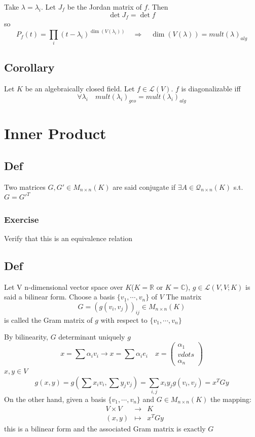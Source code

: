 \documentclass{book}
\begin{document}
Take $\lambda=\lambda_i$. Let $J_f$ be the Jordan matrix of $f$. Then $$\det J_f=\det f$$
so 
$$P_f(t)=\prod\limits_i(t-\lambda_i)^{\dim (V(\lambda_i))}\quad\Rightarrow\quad \dim(V(\lambda))=mult(\lambda)_{alg}$$
\section{Corollary}
Let $K$ be an algebraically closed field. Let $f\in \mathscr{L}(V)$. $f$ is diagonalizable iff $$\forall\lambda_i\quad mult(\lambda_i)_{geo}=mult(\lambda_i)_{alg}$$
\chapter{Inner Product}
\section{Def}Two matrices $G,G'\in M_{n\times n}(K)$ are said conjugate if $\exists A\in \mathcal{Q}_{n\times n}(K)$ s.t. $G=G'^T$
\subsection*{Exercise}
Verify that this is an equivalence relation
\section{Def}
Let V n-dimensional vector space over $K$($K=\mathbb{R}$ or $K=\mathbb{C}$), $g\in \mathscr{L}(V,V;K)$ is said a bilinear form. Choose a basis $\{v_1,\cdots,v_n\}$ of $V$ The matrix $$G=(g(v_i,v_j))_{ij}\in M_{n\times n}(K)$$ is called the Gram matrix of $g$ with respect to $\{v_1,\cdots,v_n\}$

By bilinearity, $G$ determinant uniquely $g$$$x=\sum\alpha_iv_i\rightarrow x=\sum\alpha_ie_i\quad x=\begin{pmatrix}
    \alpha_1\\vdots\\\alpha_n
\end{pmatrix}$$
$x,y\in V$
$$g(x,y)=g(\sum x_iv_i,\sum y_jv_j)=\sum\limits_{i,j}x_iy_jg(v_i,v_j)=x^TGy$$
On the other hand, given a basis $\{v_1,\cdots,v_n\}$ and $G\in M_{n\times n}(K)$ the mapping:
$$\begin{aligned}
    &V\times V &\rightarrow &K\\
    &(x,y)&\mapsto &x^TGy
\end{aligned}$$
this is a bilinear form and the associated Gram matrix is exactly $G$
\end{document}
